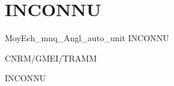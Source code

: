 %
\section{INCONNU}

 {\sf MoyEch\_mnq\_Angl\_auto\_unit}
INCONNU

\bigskip





CNRM/GMEI/TRAMM

INCONNU
